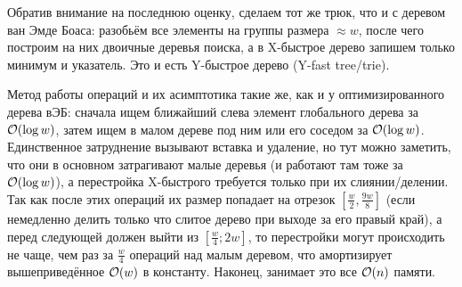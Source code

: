 Обратив внимание на последнюю оценку, сделаем тот же трюк, что и с деревом ван Эмде Боаса: разобьём все элементы на группы размера $\approx w$, после чего построим на них двоичные деревья поиска, а в X-быстрое дерево запишем только минимум и указатель. Это и есть Y-быстрое дерево (Y-fast tree/trie).

Метод работы операций и их асимптотика такие же, как и у оптимизированного дерева вЭБ: сначала ищем ближайший слева элемент глобального дерева за $\mathcal{O}(\log w)$, затем ищем в малом дереве под ним или его соседом за $\mathcal{O}(\log w)$. Единственное затруднение вызывают вставка и удаление, но тут можно заметить, что они в основном затрагивают малые деревья (и работают там тоже за $\mathcal{O}(\log w)$), а перестройка X-быстрого требуется только при их слиянии/делении. Так как после этих операций их размер попадает на отрезок $[\frac{w}{2}, \frac{9w}{8}]$ (если немедленно делить только что слитое дерево при выходе за его правый край), а перед следующей должен выйти из $[\frac{w}{4}; 2w]$, то перестройки могут происходить не чаще, чем раз за $\frac{w}{4}$ операций над малым деревом, что амортизирует вышеприведённое $\mathcal{O}(w)$ в константу. Наконец, занимает это все $\mathcal{O}(n)$ памяти.